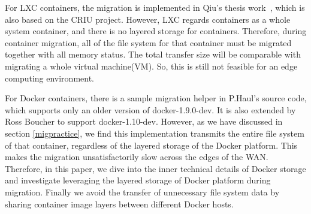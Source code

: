 For LXC containers, the migration is implemented in Qiu's thesis work~\cite{qiu2016evaluating}, which is also based on the CRIU project. However, LXC regards containers as a whole system container, and there is no layered storage for containers. Therefore, during container migration, all of the file system for that container must be migrated together with all memory status. The total transfer size will be comparable with migrating a whole virtual machine(VM). So, this is still not feasible for an edge computing environment. 

For Docker containers, there is a sample migration helper in P.Haul's source code, which supports only an older version of docker-1.9.0-dev. It is also extended by Ross Boucher to support docker-1.10-dev. However, as we have discussed in section \ref{migpractice}, we find this implementation transmits the entire file system of that container, regardless of the layered storage of the Docker platform. This makes the migration unsatisfactorily slow across the edges of the WAN. Therefore, in this paper, we dive into the inner technical details of Docker storage and investigate leveraging the layered storage of Docker platform during migration. Finally we avoid the transfer of unnecessary file system data by sharing container image layers between different Docker hosts. 


